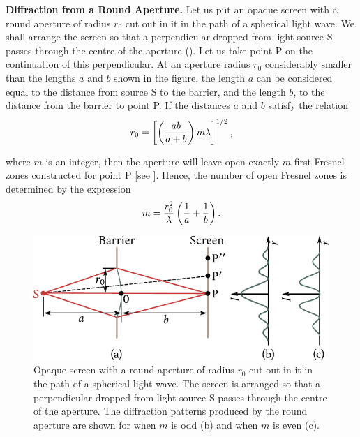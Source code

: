 \textbf{Diffraction from a Round Aperture.}
Let us put an opaque screen with a round aperture of radius $r_0$ cut out in it in the path of a spherical light wave.
We shall arrange the screen so that a perpendicular dropped from light source S passes through the centre of the aperture ().
Let us take point P on the continuation of this perpendicular.
At an aperture radius $r_0$ considerably smaller than the lengths $a$ and $b$ shown in the figure, the length $a$ can be considered equal to the distance from source S to the barrier, and the length $b$, to the distance from the barrier to point P.
If the distances $a$ and $b$ satisfy the relation
\begin{equation}\label{eq:18_12}
	r_0 = \left[ \left( \frac{ab}{a+b} \right) m \lambda \right]^{1/2},
\end{equation}

\noindent
where $m$ is an integer, then the aperture will leave open exactly $m$ first Fresnel zones constructed for point P [see ].
Hence, the number of open Fresnel zones is determined by the expression
\begin{equation}\label{eq:18_13}
	m = \frac{r_0^2}{\lambda} \left(\frac{1}{a} + \frac{1}{b}\right).
\end{equation}

\begin{figure}[t]
	\begin{center}
		\includegraphics[scale=1]{figures/ch_18/fig_18_10.pdf}
        \caption[]{Opaque screen with a round aperture of radius $r_0$ cut out in it in the path of a spherical light wave. The screen is arranged so that a perpendicular dropped from light source S passes through the centre of the aperture. The diffraction patterns produced by the round aperture are shown for when $m$ is odd (b) and when $m$ is even (c).}
		\label{fig:18_10}
	\end{center}
	\vspace{-0.8cm}
\end{figure}

